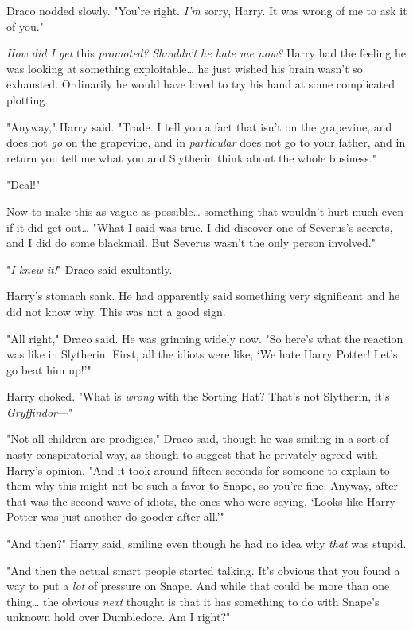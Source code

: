 Draco nodded slowly. "You're right. \emph{I'm} sorry, Harry. It was wrong of me
to ask it of you."

\emph{How did I get} this \emph{promoted? Shouldn't he hate me now?} Harry had
the feeling he was looking at something exploitable{\ldots} he just wished his
brain wasn't so exhausted. Ordinarily he would have loved to try his hand at
some complicated plotting.

"Anyway," Harry said. "Trade. I tell you a fact that isn't on the grapevine,
and does not \emph{go} on the grapevine, and in \emph{particular} does not go
to your father, and in return you tell me what you and Slytherin think about
the whole business."

"Deal!"

Now to make this as vague as possible{\ldots} something that wouldn't hurt much
even if it did get out{\ldots} "What I said was true. I did discover one of
Severus's secrets, and I did do some blackmail. But Severus wasn't the only
person involved."

"\emph{I knew it!}" Draco said exultantly.

Harry's stomach sank. He had apparently said something very significant and he
did not know why. This was not a good sign.

"All right," Draco said. He was grinning widely now. "So here's what the
reaction was like in Slytherin. First, all the idiots were like, `We hate Harry
Potter! Let's go beat him up!'"

Harry choked. "What is \emph{wrong} with the Sorting Hat? That's not Slytherin,
it's \emph{Gryffindor}---"

"Not all children are prodigies," Draco said, though he was smiling in a sort
of nasty-conspiratorial way, as though to suggest that he privately agreed with
Harry's opinion. "And it took around fifteen seconds for someone to explain to
them why this might not be such a favor to Snape, so you're fine. Anyway, after
that was the second wave of idiots, the ones who were saying, `Looks like Harry
Potter was just another do-gooder after all.'"

"And then?" Harry said, smiling even though he had no idea why \emph{that} was
stupid.

"And then the actual smart people started talking. It's obvious that you found
a way to put a \emph{lot} of pressure on Snape. And while that could be more
than one thing{\ldots} the obvious \emph{next} thought is that it has something
to do with Snape's unknown hold over Dumbledore. Am I right?"

